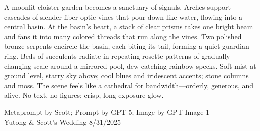 \documentclass[12pt]{article}
\begin{document}
\noindent
\begin{adjustbox}{max size={\textwidth}{\textheight}}
\begin{varwidth}{\textwidth}
\RaggedRight
\footnotesize
A moonlit cloister garden becomes a sanctuary of signals. Arches support cascades of slender fiber‑optic vines that pour down like water, flowing into a central basin. At the basin’s heart, a stack of clear prisms takes one bright beam and fans it into many colored threads that run along the vines. Two polished bronze serpents encircle the basin, each biting its tail, forming a quiet guardian ring. Beds of succulents radiate in repeating rosette patterns of gradually changing scale around a mirrored pool, dew catching rainbow specks. Soft mist at ground level, starry sky above; cool blues and iridescent accents; stone columns and moss. The scene feels like a cathedral for bandwidth—orderly, generous, and alive. No text, no figures; crisp, long‑exposure glow.
\end{varwidth}
\end{adjustbox}
\vfill
{\raggedleft\footnotesize
Metaprompt by Scott; Prompt by GPT-5; Image by GPT Image 1 \\
Yutong \& Scott's Wedding 8/31/2025\par}
\end{document}
